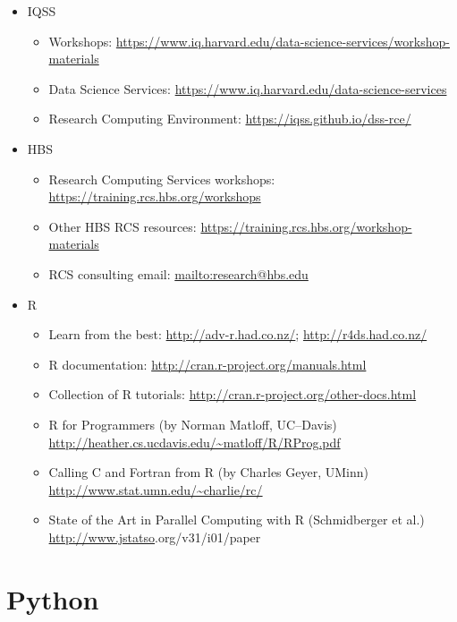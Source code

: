 \documentclass[
]{book}
\providecommand{\tightlist}{%
  \setlength{\itemsep}{0pt}\setlength{\parskip}{0pt}}
\begin{document}
\begin{itemize}
\tightlist
\item
  IQSS

  \begin{itemize}
  \tightlist
  \item
    Workshops: \url{https://www.iq.harvard.edu/data-science-services/workshop-materials}
  \item
    Data Science Services: \url{https://www.iq.harvard.edu/data-science-services}
  \item
    Research Computing Environment: \url{https://iqss.github.io/dss-rce/}
  \end{itemize}
\item
  HBS

  \begin{itemize}
  \tightlist
  \item
    Research Computing Services workshops: \url{https://training.rcs.hbs.org/workshops}
  \item
    Other HBS RCS resources: \url{https://training.rcs.hbs.org/workshop-materials}
  \item
    RCS consulting email: \url{mailto:research@hbs.edu}
  \end{itemize}
\item
  R

  \begin{itemize}
  \tightlist
  \item
    Learn from the best: \url{http://adv-r.had.co.nz/}; \url{http://r4ds.had.co.nz/}
  \item
    R documentation: \url{http://cran.r-project.org/manuals.html}
  \item
    Collection of R tutorials: \url{http://cran.r-project.org/other-docs.html}
  \item
    R for Programmers (by Norman Matloff, UC--Davis) \url{http://heather.cs.ucdavis.edu/~matloff/R/RProg.pdf}
  \item
    Calling C and Fortran from R (by Charles Geyer, UMinn) \url{http://www.stat.umn.edu/~charlie/rc/}
  \item
    State of the Art in Parallel Computing with R (Schmidberger et al.) \url{http://www.jstatso}\textbar.org/v31/i01/paper
  \end{itemize}
\end{itemize}

\hypertarget{part-python}{%
\part{Python}\label{part-python}}
\end{document}

